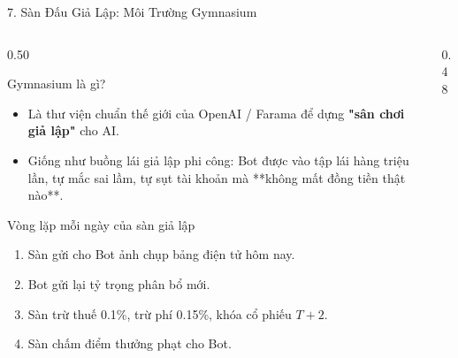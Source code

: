 \documentclass[aspectratio=169, 10pt]{beamer}
\begin{document}
\begin{frame}{7. Sàn Đấu Giả Lập: Môi Trường Gymnasium}
  \begin{columns}[t]
    \begin{column}{0.50\textwidth}
      \begin{block}{Gymnasium là gì?}
        \small
        \begin{itemize}
          \item Là thư viện chuẩn thế giới của OpenAI / Farama để dựng \textbf{"sân chơi giả lập"} cho AI.
          \item Giống như buồng lái giả lập phi công: Bot được vào tập lái hàng triệu lần, tự mắc sai lầm, tự sụt tài khoản mà **không mất đồng tiền thật nào**.
        \end{itemize}
      \end{block}

      \vspace{-0.5ex}
      \begin{block}{Vòng lặp mỗi ngày của sàn giả lập}
        \small
        \begin{enumerate}
          \item Sàn gửi cho Bot ảnh chụp bảng điện tử hôm nay.
          \item Bot gửi lại tỷ trọng phân bổ mới.
          \item Sàn trừ thuế 0.1\%, trừ phí 0.15\%, khóa cổ phiếu $T+2$.
          \item Sàn chấm điểm thưởng phạt cho Bot.
        \end{enumerate}
      \end{block}
    \end{column}

    \begin{column}{0.48\textwidth}
    \end{column}
  \end{columns}
\end{frame}
\end{document}
